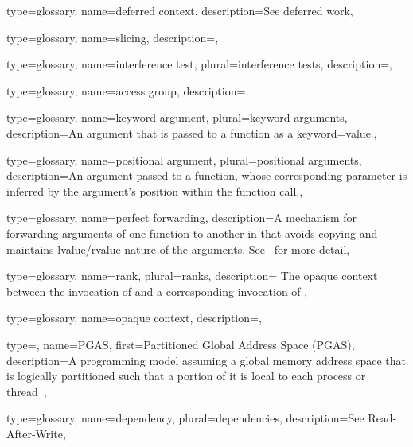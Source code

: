 {
  type=glossary,
  name={deferred context},
  description={See \gls{deferred work}},
}

{
  type={glossary},
  name={slicing},
  description={},
}

{
  type={glossary},
  name={interference test},
  plural={interference tests},
  description={},
}


{
  type={glossary},
  name={access group},
  description={},
}

{
  type={glossary},
  name={keyword argument},
  plural={keyword arguments},
  description={An argument that is passed to a function as a keyword=value.},
}

{
  type={glossary},
  name={positional argument},
  plural={positional arguments},
  description={An argument passed to a function, whose corresponding parameter
    is inferred by the argument's position within the function call.},
}

{
  type={glossary},
  name={perfect forwarding},
  description={A mechanism for forwarding arguments of one function to another
    in \CC{} that avoids copying and maintains lvalue/rvalue nature of the
      arguments. See~\cite{perfect-forwarding} for more detail},
}

{
  type=glossary,
  name=rank,
  plural=ranks,
  description={ The \gls{opaque context} between the invocation of
     and a corresponding invocation of },
}

{
  type=glossary,
  name={opaque context},
  description={},
}


{
  type=\acronymtype,
  name={PGAS},
  first={Partitioned Global Address Space (PGAS)},
  description={A programming model assuming a global memory address space that is logically
    partitioned such that a portion of it is local to each process or thread~\cite{PGAS}},
}


{
  type=glossary,
  name=dependency,
  plural=dependencies,
  description={See \gls{Read-After-Write}},
}


